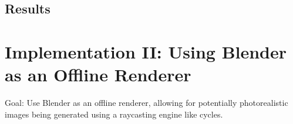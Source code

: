 \subsection{Results}

\section{Implementation II: Using Blender as an Offline Renderer}
Goal: Use Blender as an offline renderer, allowing for potentially photorealistic images being generated using a raycasting engine like cycles.


